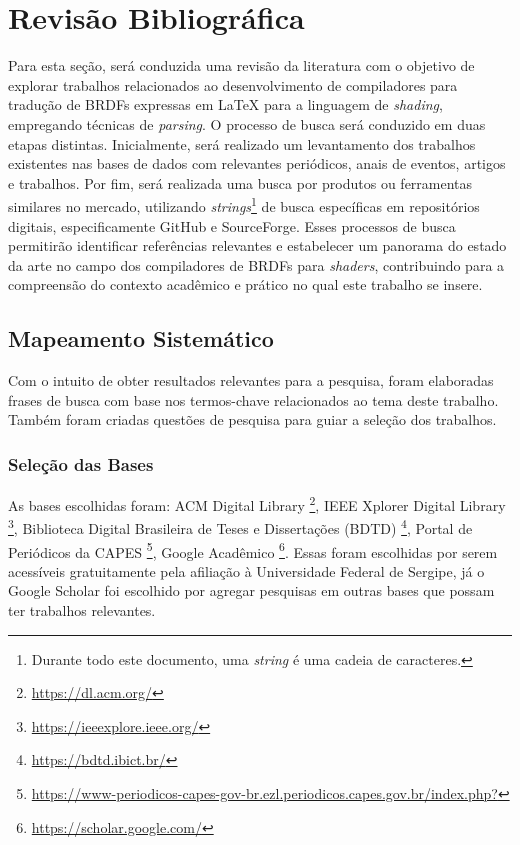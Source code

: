 
\chapter{Revisão Bibliográfica} \label{revisao}


Para esta seção, será conduzida uma revisão da literatura com o objetivo de explorar trabalhos relacionados ao desenvolvimento de compiladores para tradução de BRDFs expressas em \LaTeX{} para a linguagem de \textit{shading}, empregando técnicas de \textit{parsing}. O processo de busca será conduzido em duas etapas distintas. Inicialmente, será realizado um levantamento dos trabalhos existentes nas bases de dados  com relevantes periódicos, anais de eventos, artigos e trabalhos. Por fim, será realizada uma busca por produtos ou ferramentas similares no mercado, utilizando \textit{strings}\footnote{Durante todo este documento, uma \textit{string} é uma cadeia de caracteres.} de busca específicas em repositórios digitais, especificamente GitHub e SourceForge. Esses processos de busca permitirão identificar referências relevantes e estabelecer um panorama do estado da arte no campo dos compiladores de BRDFs  para \textit{shaders}, contribuindo para a compreensão do contexto acadêmico e prático no qual este trabalho se insere.


\section{Mapeamento Sistemático}


Com o intuito de obter resultados relevantes para a pesquisa, foram elaboradas frases de busca com base nos termos-chave relacionados ao tema deste trabalho. Também foram criadas questões de pesquisa para guiar a seleção dos trabalhos.


\subsection{Seleção das Bases}
As bases escolhidas foram: ACM Digital Library \footnote{\url{https://dl.acm.org/}},  IEEE Xplorer Digital Library \footnote{\url{https://ieeexplore.ieee.org/}},  Biblioteca Digital Brasileira de Teses e Dissertações (BDTD) \footnote{\url{https://bdtd.ibict.br/}}, Portal de Periódicos da CAPES \footnote{\url{https://www-periodicos-capes-gov-br.ezl.periodicos.capes.gov.br/index.php?}},  Google Acadêmico \footnote{\url{https://scholar.google.com/}}. Essas foram escolhidas por serem acessíveis gratuitamente pela afiliação à Universidade Federal de Sergipe, já o Google Scholar foi escolhido por agregar pesquisas em outras bases que possam ter trabalhos relevantes.


